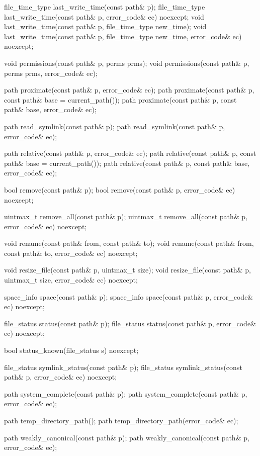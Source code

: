 \begin{codeblock}
{  file_time_type last_write_time(const path& p);
  file_time_type last_write_time(const path& p, error_code& ec) noexcept;
  void last_write_time(const path& p, file_time_type new_time);
  void last_write_time(const path& p, file_time_type new_time,
                       error_code& ec) noexcept;

  void permissions(const path& p, perms prms);
  void permissions(const path& p, perms prms, error_code& ec);

  path proximate(const path& p, error_code& ec);
  path proximate(const path& p, const path& base = current_path());
  path proximate(const path& p, const path& base, error_code& ec);

  path read_symlink(const path& p);
  path read_symlink(const path& p, error_code& ec);

  path relative(const path& p, error_code& ec);
  path relative(const path& p, const path& base = current_path());
  path relative(const path& p, const path& base, error_code& ec);

  bool remove(const path& p);
  bool remove(const path& p, error_code& ec) noexcept;

  uintmax_t remove_all(const path& p);
  uintmax_t remove_all(const path& p, error_code& ec) noexcept;

  void rename(const path& from, const path& to);
  void rename(const path& from, const path& to, error_code& ec) noexcept;

  void resize_file(const path& p, uintmax_t size);
  void resize_file(const path& p, uintmax_t size, error_code& ec) noexcept;

  space_info space(const path& p);
  space_info space(const path& p, error_code& ec) noexcept;

  file_status status(const path& p);
  file_status status(const path& p, error_code& ec) noexcept;

  bool status_known(file_status s) noexcept;

  file_status symlink_status(const path& p);
  file_status symlink_status(const path& p, error_code& ec) noexcept;

  path system_complete(const path& p);
  path system_complete(const path& p, error_code& ec);

  path temp_directory_path();
  path temp_directory_path(error_code& ec);

  path weakly_canonical(const path& p);
  path weakly_canonical(const path& p, error_code& ec);
}
\end{codeblock}

